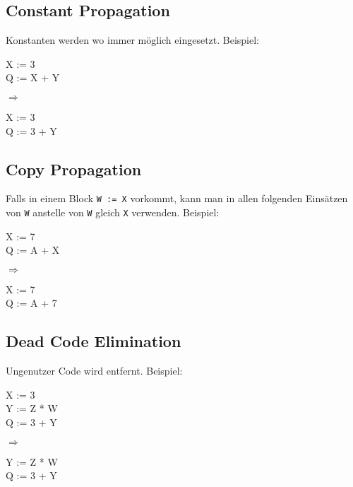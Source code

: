 \subsection{Constant Propagation}

Konstanten werden wo immer möglich eingesetzt. Beispiel:

\begin{varwidth}{\textwidth}\ttfamily
X := 3\\
Q := X + Y
\end{varwidth}%
\hspace{1cm}$\Rightarrow$\hspace{1cm}%
\begin{varwidth}{\textwidth}\ttfamily
X := 3\\
Q := 3 + Y
\end{varwidth}

\subsection{Copy Propagation}

Falls in einem Block \texttt{W := X} vorkommt, kann man in allen folgenden
Einsätzen von \texttt{W} anstelle von \texttt{W} gleich \texttt{X} verwenden.
Beispiel:

\begin{varwidth}{\textwidth}\ttfamily
X := 7\\
Q := A + X
\end{varwidth}%
\hspace{1cm}$\Rightarrow$\hspace{1cm}%
\begin{varwidth}{\textwidth}\ttfamily
X := 7\\
Q := A + 7
\end{varwidth}

\subsection{Dead Code Elimination}

Ungenutzer Code wird entfernt. Beispiel:

\begin{varwidth}{\textwidth}\ttfamily
X := 3\\
Y := Z * W\\
Q := 3 + Y
\end{varwidth}%
\hspace{1cm}$\Rightarrow$\hspace{1cm}%
\begin{varwidth}{\textwidth}\ttfamily
Y := Z * W\\
Q := 3 + Y
\end{varwidth}
